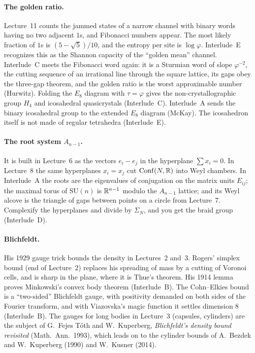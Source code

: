\paragraph{The golden ratio.} Lecture~11 counts the jammed states of a narrow channel with binary words
having no two adjacent $1$s, and Fibonacci numbers appear. The most likely fraction of $1$s is
$(5-\sqrt5)/10$, and the entropy per site is $\log\varphi$. Interlude~E recognizes this as the Shannon
capacity of the ``golden mean'' channel. Interlude~C meets the Fibonacci word again: it is a Sturmian
word of slope $\varphi^{-2}$, the cutting sequence of an irrational line through the square lattice, its gaps obey the three-gap
theorem, and the golden ratio is the worst approximable number (Hurwitz). Folding the $E_8$ diagram
with $\tau=\varphi$ gives the non-crystallographic group $H_4$ and icosahedral quasicrystals
(Interlude~C). Interlude~A sends the binary icosahedral group to the extended $E_8$ diagram (McKay).
The icosahedron itself is not made of regular tetrahedra (Interlude~E).

\paragraph{The root system $A_{n-1}$.} It is built in Lecture~6 as the vectors $e_i-e_j$ in the
hyperplane $\sum x_i=0$. In Lecture~8 the same hyperplanes $x_i=x_j$ cut $\operatorname{Conf}(N,\mathbb{R})$ into Weyl
chambers. In Interlude~A the roots are the eigenvalues of conjugation on the matrix units
$E_{ij}$; the maximal torus of $\mathrm{SU}(n)$ is $\mathbb{R}^{n-1}$ modulo the $A_{n-1}$ lattice; and its Weyl
alcove is the triangle of gaps between points on a circle from Lecture~7. Complexify the hyperplanes
and divide by $\Sigma_N$, and you get the braid group (Interlude~D).

\paragraph{Blichfeldt.} His 1929 gauge trick bounds the density in Lectures~2 and~3. Rogers' simplex bound (end of Lecture~2) replaces his
spreading of mass by a cutting of Voronoi cells, and is sharp in the plane, where it is Thue's theorem. His 1914 lemma
proves Minkowski's convex body theorem (Interlude~B). The Cohn--Elkies bound is a ``two-sided''
Blichfeldt gauge, with positivity demanded on both sides of the Fourier transform, and with Viazovska's
magic function it settles dimension $8$ (Interlude~B). The gauges for long bodies in Lecture~3 (capsules, cylinders) are the
subject of G.~Fejes T\'oth and W.~Kuperberg, \emph{Blichfeldt's density bound revisited} (Math.\ Ann.\ 1993),
which leads on to the cylinder bounds of A.~Bezdek and W.~Kuperberg (1990) and W.~Kusner (2014).

